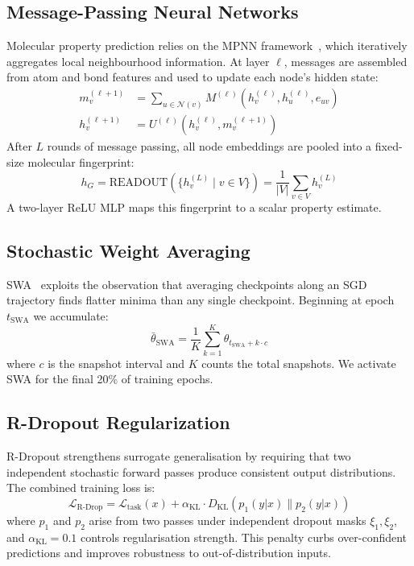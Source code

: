 \documentclass[twocolumn,10pt]{article}
\begin{document}
\subsection{Message-Passing Neural Networks}

Molecular property prediction relies on the MPNN framework~\cite{gilmer2017neural}, which
iteratively aggregates local neighbourhood information. At layer $\ell$, messages are
assembled from atom and bond features and used to update each node's hidden state:
\begin{align}
m_v^{(\ell+1)} &= \sum_{u \in \mathcal{N}(v)} M^{(\ell)}\left(h_v^{(\ell)}, h_u^{(\ell)}, e_{uv}\right) \label{eq:mpnn_message} \\
h_v^{(\ell+1)} &= U^{(\ell)}\left(h_v^{(\ell)}, m_v^{(\ell+1)}\right) \label{eq:mpnn_update}
\end{align}
After $L$ rounds of message passing, all node embeddings are pooled into a fixed-size
molecular fingerprint:
\begin{equation}
h_G = \text{READOUT}\left(\{h_v^{(L)} \mid v \in V\}\right) = \frac{1}{|V|} \sum_{v \in V} h_v^{(L)}
\label{eq:readout}
\end{equation}
A two-layer ReLU MLP maps this fingerprint to a scalar property estimate.

\subsection{Stochastic Weight Averaging}

SWA~\cite{polyak1992acceleration} exploits the observation that averaging checkpoints along an
SGD trajectory finds flatter minima than any single checkpoint. Beginning at epoch
$t_\text{SWA}$ we accumulate:
\begin{equation}
\bar{\theta}_\text{SWA} = \frac{1}{K} \sum_{k=1}^{K} \theta_{t_\text{SWA} + k \cdot c}
\label{eq:swa}
\end{equation}
where $c$ is the snapshot interval and $K$ counts the total snapshots. We activate SWA for
the final 20\% of training epochs.

\subsection{R-Dropout Regularization}

R-Dropout strengthens surrogate generalisation by requiring that two independent stochastic
forward passes produce consistent output distributions. The combined training loss is:
\begin{equation}
\mathcal{L}_\text{R-Drop} = \mathcal{L}_\text{task}(x) + \alpha_\text{KL} \cdot D_\text{KL}\left(p_1(y|x) \| p_2(y|x)\right)
\label{eq:rdrop}
\end{equation}
where $p_1$ and $p_2$ arise from two passes under independent dropout masks $\xi_1, \xi_2$,
and $\alpha_\text{KL} = 0.1$ controls regularisation strength. This penalty curbs
over-confident predictions and improves robustness to out-of-distribution inputs.
\end{document}

